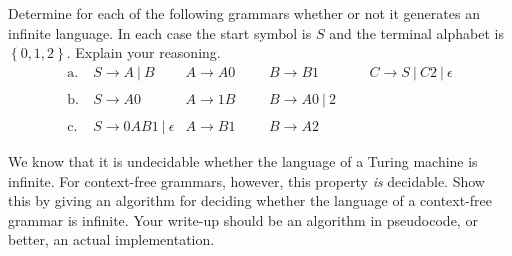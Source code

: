 \documentclass[12pt,letterpaper,boxed,cm]{hmcpset}
\newcommand{\set}[1]{\left\{ #1 \right\}}
\begin{document}
\begin{solution}
    \vfill
\end{solution}
\newpage

\begin{problem}[3.]
    [6 points] Determine for each of the following grammars whether or not it generates an infinite language. In each case the start symbol is $S$ and the terminal alphabet is $\set{0, 1, 2}$. Explain your reasoning.
    \begin{align*}
        \text{a.}~&S\rightarrow A~|~B &A\rightarrow A0 && &B\rightarrow B1 &&& C\rightarrow S~|~C2~|~\epsilon\\\\
        \text{b.}~&S\rightarrow A0 & A\rightarrow 1B && &B\rightarrow A0~|~2\\\\
        \text{c.}~&S\rightarrow 0AB1~|~\epsilon & A\rightarrow B1 && &B\rightarrow A2
    \end{align*}
\end{problem}

\begin{solution}
    \vfill
\end{solution}
\newpage

\begin{problem} We know that it is undecidable whether the language of a Turing machine is infinite. For context-free grammars, however, this property \emph{is} decidable. Show this by giving an algorithm for deciding whether the language of a context-free grammar is infinite. Your write-up should be an algorithm in pseudocode, or better, an actual implementation.
\end{problem}

\begin{solution}
    \vfill
\end{solution}
\newpage
\end{document}
